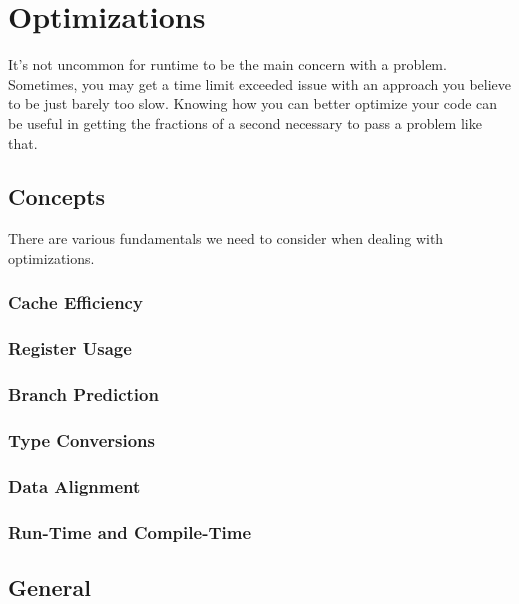 \section{Optimizations}

It's not uncommon for runtime to be the main concern with a problem. Sometimes, you may get a time limit exceeded issue with an approach you believe to be just barely too slow. Knowing how you can better optimize your code can be useful in getting the fractions of a second necessary to pass a problem like that.

\subsection{Concepts}

There are various fundamentals we need to consider when dealing with optimizations.

\subsubsection{Cache Efficiency}

\subsubsection{Register Usage}

\subsubsection{Branch Prediction}

\subsubsection{Type Conversions}

\subsubsection{Data Alignment}

\subsubsection{Run-Time and Compile-Time}

\subsection{General}

